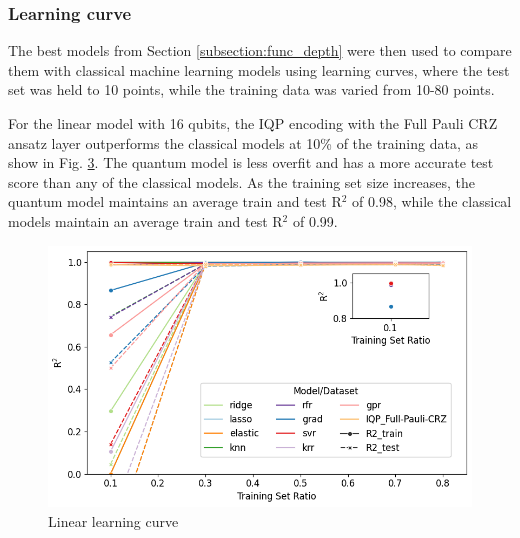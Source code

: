 \documentclass[journal=jacsat,manuscript=article]{achemso}
\begin{document}
\begin{figure}[H]
\begin{subfigure}[b]{\textwidth}
		\caption{}
		\label{fig:16qubit_Sine_RUD_AL}
	\end{subfigure}
	\caption{}
	\label{fig:16qubit_Func_RUD_AL}
\end{figure}

\subsubsection{Learning curve}
The best models from Section \ref{subsection:func_depth} were then used to compare them with classical machine learning models using learning curves, where the test set was held to 10 points, while the training data was varied from 10-80 points.

For the linear model with 16 qubits, the IQP encoding with the Full Pauli CRZ ansatz layer outperforms the classical models at 10\% of the training data, as show in  Fig. \ref{fig:linear_learning_curves}.
The quantum model is less overfit and has a more accurate test score than any of the classical models. 
As the training set size increases, the quantum model maintains an average train and test R$^{2}$ of 0.98, while the classical models maintain an average train and test R$^{2}$ of 0.99.
\begin{figure}[H]
	\centering
	\includegraphics[width=\textwidth]{images/Function_Fitting/linear_learning_curves.png}
	\caption{Linear learning curve}
	\label{fig:linear_learning_curves}
\end{figure}
\end{document}
